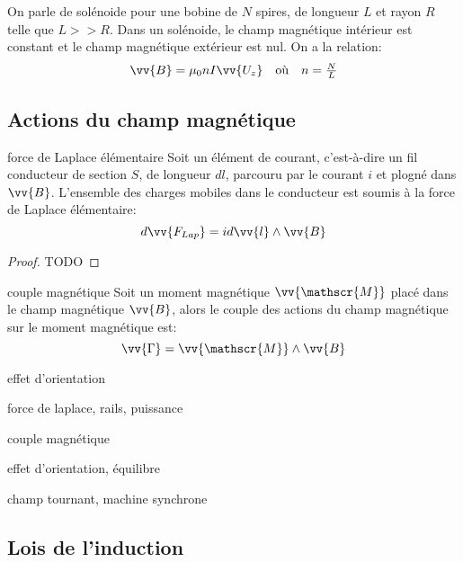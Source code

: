 \begin{proposition}{}{}
    On parle de solénoide pour une bobine de $N$ spires, de longueur $L$ et rayon $R$ telle que $L >> R$.
    Dans un solénoide, le champ magnétique intérieur est constant et le champ magnétique extérieur est nul.
    On a la relation:
    \[\begin{array}{lcr}
         \vv{B} = \mu_{0}n I \vv{U_{z}} & \text{où} & n = \frac{N}{L}
    \end{array} \]
\end{proposition}

\subsection{Actions du champ magnétique}

\begin{proposition}{force de Laplace élémentaire}{}
    Soit un élément de courant, c'est-à-dire un fil conducteur de section $S$, de longueur $dl$, parcouru par le courant $i$ et plogné dans $\vv{B}$.
    L'ensemble des charges mobiles dans le conducteur est soumis à la force de Laplace élémentaire:
    \[ d\vv{F_{Lap}} = i d\vv{l} \wedge \vv{B} \]
\end{proposition}

\begin{proof}
    TODO
\end{proof}

\begin{proposition}{couple magnétique}{}
    Soit un moment magnétique $\vv{\mathscr{M}}$ placé dans le champ magnétique $\vv{B}$, alors le couple des actions du champ magnétique sur le moment magnétique est:
    \[ \vv{\Gamma} = \vv{\mathscr{M}} \wedge \vv{B} \]
\end{proposition}

\begin{proposition}{effet d'orientation}{}
    
\end{proposition}

force de laplace, rails, puissance

couple magnétique

effet d'orientation, équilibre

champ tournant, machine synchrone

\subsection{Lois de l'induction}

